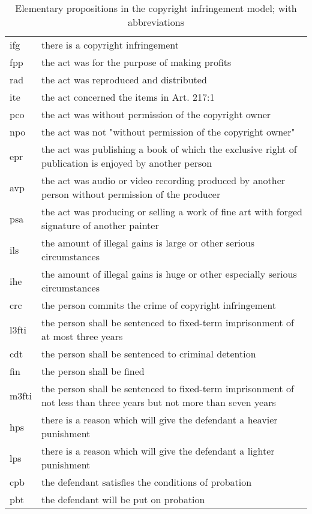 \documentclass{IOS-Book-Article}
\begin{document}
\begin{table}[t]
	\tiny
	\caption{Elementary propositions in the copyright infringement model; with abbreviations}
	\label{tab:long}
	\begin{tabularx}{\textwidth}{p{0.5cm}|p{11cm}}
		\hline
		ifg & there is a copyright infringement\\
		fpp & the act was for the purpose of making profits\\
		rad & the act was reproduced and distributed\\
		ite & the act concerned the items in Art. 217:1\\
		pco & the act was without permission of the copyright owner\\
		npo & the act was not "without permission of the copyright owner"\\
		epr & the act was publishing a book of which the exclusive right of publication is enjoyed by another person\\
		avp & the act was audio or video recording produced by another person without permission of the producer\\
		psa & the act was producing or selling a work of fine art with forged signature of another painter\\
		ils & the amount of illegal gains is large or other serious circumstances\\
		ihe & the amount of illegal gains is huge or other especially serious circumstances\\
		crc & the person commits the crime of copyright infringement\\
		l3fti & the person shall be sentenced to fixed-term imprisonment of at most three years\\
		cdt & the person shall be sentenced to criminal detention\\
		fin & the person shall be fined\\
		m3fti & the person shall be sentenced to fixed-term imprisonment of not less than three years but not more than seven years\\
		hps & there is a reason which will give the defendant a heavier punishment\\
		lps & there is a reason which will give the defendant a lighter punishment\\
		cpb & the defendant satisfies the conditions of probation\\
		pbt & the defendant will be put on probation\\
		\hline
	\end{tabularx}
\end{table}
\normalsize
\end{document}
